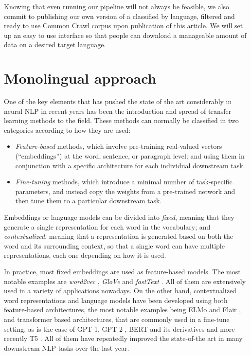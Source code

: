 Knowing that even running our pipeline will not always be feasible, we also commit to publishing our own version of a classified by language, filtered and ready to use Common Crawl corpus upon publication of this article. We will set up an easy to use interface so that people can download a manageable amount of data on a desired target language.

\section{Monolingual approach}

One of the key elements that has pushed the state of the art considerably in neural NLP in recent years has been the introduction and spread of transfer learning methods to the field. These methods can normally be classified in two categories according to how they are used:
\begin{itemize}
    \item \emph{Feature-based} methods, which involve pre-training real-valued vectors (``embeddings'') at the word, sentence, or paragraph level; and using them in conjunction with a specific architecture for each individual downstream task.
    \item \emph{Fine-tuning} methods, which introduce a minimal number of task-specific parameters, and instead copy the weights from a pre-trained network and then tune them to a particular downstream task.
\end{itemize}
Embeddings or language models can be divided into \emph{fixed}, meaning that they generate a single representation for each word in the vocabulary; and \emph{contextualized}, meaning that a representation is generated based on both the word and its surrounding context, so that a single word can have multiple representations, each one depending on how it is used.

In practice, most fixed embeddings are used as feature-based models. The most notable examples are \emph{word2vec} \citep{mikolov-etal-2013-distributed}, \emph{GloVe} \citep{pennington-etal-2014-glove} and \emph{fastText} \citep{mikolov-etal-2018-advances}. All of them are extensively used in a variety of applications nowadays. On the other hand, contextualized word representations and language models have been developed using both feature-based architectures, the most notable examples being ELMo and Flair \citep{peters-etal-2018-deep,akbik-etal-2018-contextual}, and transformer based architectures, that are commonly used in a fine-tune setting, as is the case of GPT-1, GPT-2 \citep{radford-etal-2018-improving,radford-etal-2019-language}, BERT and its derivatives \citep{devlin-etal-2019-bert,liu-etal-2019-roberta,lan-etal-2020-albert} and more recently T5 \citep{raffel-etal-2020-exploring}. All of them have repeatedly improved the state-of-the art in many downstream NLP tasks over the last year.

